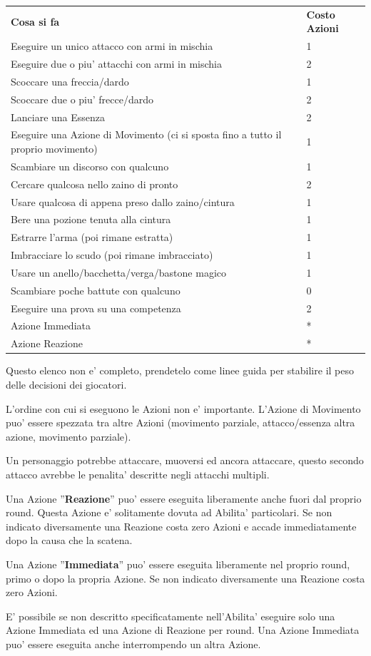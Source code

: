 \documentclass[a4paper,11pt,twoside,openany]{book}
\begin{document}
\begin{tabular}{ll}
\toprule
\textbf{Cosa si fa} & \textbf{Costo Azioni}\tabularnewline
Eseguire un unico attacco con armi in mischia & 1\tabularnewline
Eseguire due o piu' attacchi con armi in mischia & 2\tabularnewline
Scoccare una freccia/dardo & 1\tabularnewline
Scoccare due o piu' frecce/dardo & 2\tabularnewline
Lanciare una Essenza & 2\tabularnewline
Eseguire una Azione di Movimento (ci si sposta fino a tutto
il proprio movimento) & 1\tabularnewline
Scambiare un discorso con qualcuno & 1\tabularnewline
Cercare qualcosa nello zaino di pronto & 2\tabularnewline
Usare qualcosa di appena preso dallo zaino/cintura & 1\tabularnewline
Bere una pozione tenuta alla cintura & 1\tabularnewline
Estrarre l'arma (poi rimane estratta) & 1\tabularnewline
Imbracciare lo scudo (poi rimane imbracciato) & 1\tabularnewline
Usare un anello/bacchetta/verga/bastone magico & 1\tabularnewline
Scambiare poche battute con qualcuno & 0\tabularnewline
Eseguire una prova su una competenza & 2\tabularnewline
Azione Immediata & {*}\tabularnewline
Azione Reazione & {*}\tabularnewline

\end{tabular}

\smallskip

Questo elenco non e' completo, prendetelo come linee guida per stabilire il peso delle decisioni dei giocatori.

\bigskip

L'ordine con cui si eseguono le Azioni non e' importante. L'Azione di Movimento puo' essere spezzata tra altre Azioni (movimento parziale, attacco/essenza altra azione, movimento parziale).

Un personaggio potrebbe attaccare, muoversi ed ancora attaccare, questo secondo attacco avrebbe le penalita' descritte negli attacchi multipli.
\smallskip

Una Azione ''\textbf{Reazione}'' puo' essere eseguita liberamente anche fuori dal proprio round. Questa Azione e' solitamente dovuta ad Abilita' particolari. Se non indicato diversamente una Reazione costa zero Azioni e accade immediatamente dopo la causa che la scatena.
\smallskip

Una Azione ''\textbf{Immediata}'' puo' essere eseguita liberamente nel proprio round, primo o dopo la propria Azione. Se non indicato diversamente una Reazione costa zero Azioni.

E' possibile se non descritto specificatamente nell'Abilita' eseguire solo una Azione Immediata ed una Azione di Reazione per round. Una Azione Immediata puo' essere eseguita anche interrompendo un altra Azione.
\end{document}
